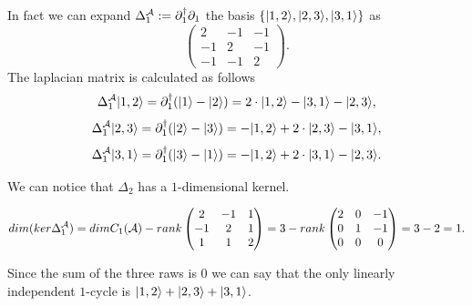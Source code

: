 \documentclass[../2.tex]{subfiles}
\begin{document}
    \begin{exa}
        In fact we can expand $\Delta_1^{\mathcal{A}} := \partial_1^\dagger\partial_1$ the basis $\{| 1,2 \rangle,| 2,3 \rangle,| 3,1 \rangle\}$ as
        \[\begin{pmatrix}
            2 & -1 & -1  \\
            -1 & 2 & -1  \\
            -1& -1 & 2 
        \end{pmatrix}.\] 
        The laplacian matrix is calculated as follows
        \[\Delta_1^{\mathcal{A}}| 1,2 \rangle = \partial_1^\dagger(| 1 \rangle-| 2 \rangle) = 2\cdot| 1,2 \rangle-| 3,1 \rangle-| 2,3 \rangle,\]
        \[\Delta_1^{\mathcal{A}}| 2,3 \rangle = \partial_1^\dagger(| 2 \rangle-| 3 \rangle) = -| 1,2 \rangle+2\cdot| 2,3 \rangle-| 3,1 \rangle,\]
        \[\Delta_1^{\mathcal{A}}| 3,1 \rangle = \partial_1^\dagger(| 3 \rangle-| 1 \rangle) = -| 1,2 \rangle+2\cdot| 3,1 \rangle-| 2,3 \rangle.\]

        We can notice that $\Delta_2$ has a $1$-dimensional kernel.

        \[ dim(ker\Delta_1^{\mathcal{A}}) = dimC_1(\mathcal{A}) - rank
            \begin{pmatrix}
                2 & -1 & 1  \\
                -1 & 2 & 1  \\
                1& 1 & 2 
            \end{pmatrix} = 3 - rank
            \begin{pmatrix}
                2 & 0 & -1  \\
                0 & 1 & -1  \\
                0 & 0 & 0 
            \end{pmatrix} = 3 - 2 =  1. \]

        Since the sum of the three raws is $0$ we can say that the only linearly independent $1$-cycle is $| 1,2 \rangle+| 2,3 \rangle+| 3,1 \rangle$.
    \end{exa}
\end{document}

